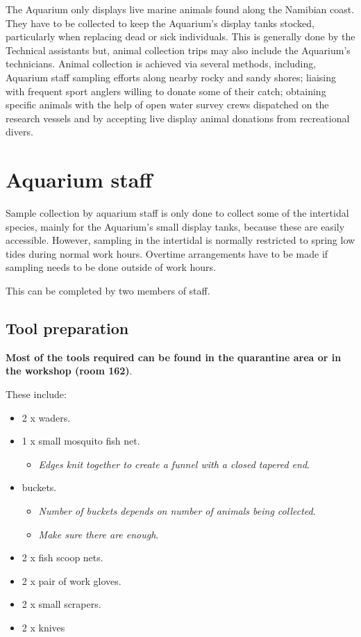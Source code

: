 \documentclass[
  letterpaper,
  DIV=11,
  numbers=noendperiod]{scrreprt}
\providecommand{\tightlist}{%
  \setlength{\itemsep}{0pt}\setlength{\parskip}{0pt}}\usepackage{longtable,booktabs,array}
\begin{document}
The Aquarium only displays live marine animals found along the Namibian
coast. They have to be collected to keep the Aquarium's display tanks
stocked, particularly when replacing dead or sick individuals. This is
generally done by the Technical assistants but, animal collection trips
may also include the Aquarium's technicians. Animal collection is
achieved via several methods, including, Aquarium staff sampling efforts
along nearby rocky and sandy shores; liaising with frequent sport
anglers willing to donate some of their catch; obtaining specific
animals with the help of open water survey crews dispatched on the
research vessels and by accepting live display animal donations from
recreational divers.

\hypertarget{aquarium-staff}{%
\section{Aquarium staff}\label{aquarium-staff}}

Sample collection by aquarium staff is only done to collect some of the
intertidal species, mainly for the Aquarium's small display tanks,
because these are easily accessible. However, sampling in the intertidal
is normally restricted to spring low tides during normal work hours.
Overtime arrangements have to be made if sampling needs to be done
outside of work hours.

{This can be completed by two members of staff.}

\hypertarget{sec-collect-tool}{%
\subsection{Tool preparation}\label{sec-collect-tool}}

\textbf{Most of the tools required can be found in the quarantine area
or in the workshop (room 162)}.

These include:

\begin{itemize}
\tightlist
\item
  2 x waders.
\item
  1 x small mosquito fish net.

  \begin{itemize}
  \tightlist
  \item
    \emph{Edges knit together to create a funnel with a closed tapered
    end}.
  \end{itemize}
\item
  buckets.

  \begin{itemize}
  \tightlist
  \item
    \emph{Number of buckets depends on number of animals being
    collected}.
  \item
    \emph{Make sure there are enough}.
  \end{itemize}
\item
  2 x fish scoop nets.
\item
  2 x pair of work gloves.
\item
  2 x small scrapers.
\item
  2 x knives
\end{itemize}
\end{document}
